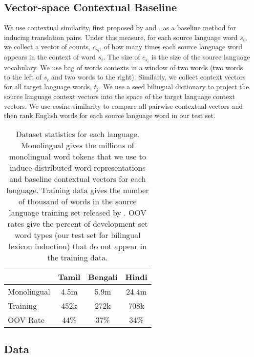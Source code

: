 \documentclass[11pt]{article}
\begin{document}
\subsection{Vector-space Contextual Baseline}\label{sec:contextbaseline}
We use contextual similarity, first proposed by  and , as a baseline method for inducing translation pairs. 
Under this measure, for each source language word $s_i$, we collect a vector of counts, $c_{s_i}$, of how many times each source language word appears in the context of word $s_i$. 
The size of $c_{s_i}$ is the size of the source language vocabulary.
We use bag of words contexts in a window of two words (two words to the left of $s_i$ and two words to the right). 
Similarly, we collect context vectors for all target language words, $t_j$. 
We use a seed bilingual dictionary to project the source language context vectors into the space of the target language context vectors.
We use cosine similarity to compare all pairwise contextual vectors and then rank English words for each source language word in our test set.


\begin{table}
\vspace{-.25cm}
\small
\begin{center}
\begin{tabular}{|l|c|c|c|}
\hline
{} & Tamil & Bengali & Hindi \\
\hline
Monolingual & 4.5m & 5.9m & 24.4m \\ %
Training & 452k & 272k & 708k \\
OOV Rate & 44\% & 37\% & 34\% \\
\hline
\end{tabular}
\end{center}
\vspace{-.45cm}
\caption{Dataset statistics for each language. Monolingual gives the millions of monolingual word tokens that we use to induce distributed word representations and baseline contextual vectors for each language. Training data gives the number of thousand of words in the source language training set released by . OOV rates give the percent of development set word types (our test set for bilingual lexicon induction) that do not appear in the training data.}\label{datastats}
\vspace{-.45cm}
\end{table}

\subsection{Data}
\end{document}
